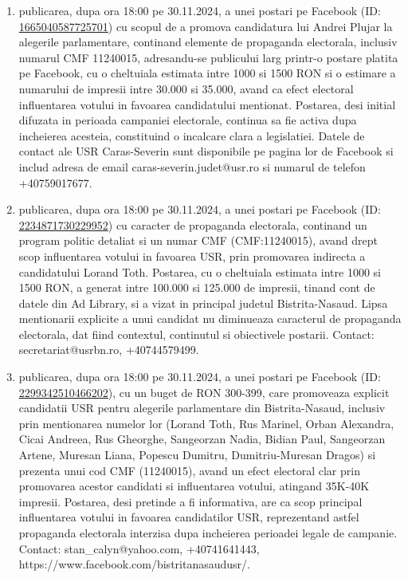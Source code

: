 \documentclass[a4paper,12pt]{article}
\begin{document}
\begin{enumerate}[leftmargin=*, label=\arabic*.)]
    \item publicarea, dupa ora 18:00 pe 30.11.2024, a unei postari pe Facebook (ID: \href{https://www.facebook.com/ads/library/?id=1665040587725701}{1665040587725701}) cu scopul de a promova candidatura lui Andrei Plujar la alegerile parlamentare, continand elemente de propaganda electorala, inclusiv numarul CMF 11240015,  adresandu-se publicului larg printr-o postare platita pe Facebook, cu o cheltuiala estimata intre 1000 si 1500 RON si o estimare a numarului de impresii intre 30.000 si 35.000, avand ca efect electoral influentarea votului in favoarea candidatului mentionat.  Postarea, desi initial difuzata in perioada campaniei electorale, continua sa fie activa dupa incheierea acesteia, constituind o incalcare clara a legislatiei.  Datele de contact ale USR Caras-Severin sunt disponibile pe pagina lor de Facebook si includ adresa de email caras-severin.judet@usr.ro si numarul de telefon +40759017677.
    \item publicarea, dupa ora 18:00 pe 30.11.2024, a unei postari pe Facebook (ID: \href{https://www.facebook.com/ads/library/?id=2234871730229952}{2234871730229952}) cu caracter de propaganda electorala,  continand un program politic detaliat si un numar CMF (CMF:11240015),  avand drept scop influentarea votului in favoarea USR,  prin promovarea indirecta a candidatului Lorand Toth. Postarea, cu o cheltuiala estimata intre 1000 si 1500 RON, a generat intre 100.000 si 125.000 de impresii,  tinand cont de datele din Ad Library,  si a vizat in principal judetul Bistrita-Nasaud.  Lipsa mentionarii explicite a unui candidat nu diminueaza caracterul de propaganda electorala, dat fiind contextul, continutul si obiectivele postarii.  Contact: secretariat@usrbn.ro, +40744579499.
    \item publicarea, dupa ora 18:00 pe 30.11.2024, a unei postari pe Facebook (ID: \href{https://www.facebook.com/ads/library/?id=2299342510466202}{2299342510466202}), cu un buget de RON 300-399, care promoveaza explicit candidatii USR pentru alegerile parlamentare din Bistrita-Nasaud, inclusiv prin mentionarea numelor lor (Lorand Toth, Rus Marinel, Orban Alexandra, Cicai Andreea, Rus Gheorghe, Sangeorzan Nadia, Bidian Paul, Sangeorzan Artene, Muresan Liana, Popescu Dumitru, Dumitriu-Muresan Dragos) si prezenta unui cod CMF (11240015), avand un efect electoral clar prin promovarea acestor candidati si influentarea votului, atingand 35K-40K impresii.  Postarea, desi pretinde a fi informativa, are ca scop principal influentarea votului in favoarea candidatilor USR, reprezentand astfel propaganda electorala interzisa dupa incheierea perioadei legale de campanie. Contact: stan\_calyn@yahoo.com, +40741641443, https://www.facebook.com/bistritanasaudusr/.

\end{enumerate}
\end{document}

